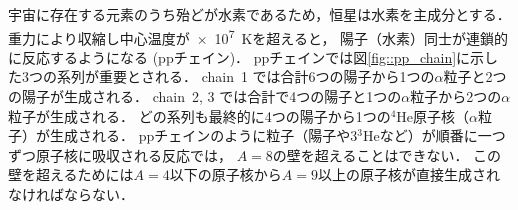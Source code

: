 \documentclass[../master]{subfiles}
\begin{document}
宇宙に存在する元素のうち殆どが水素であるため，恒星は水素を主成分とする．
重力により収縮し中心温度が\SI{e7}{\kelvin}を超えると，
陽子（水素）同士が連鎖的に反応するようになる (ppチェイン)．
ppチェインでは図\ref{fig::pp_chain}に示した3つの系列が重要とされる．
chain~1 では合計6つの陽子から1つの$\alpha$粒子と2つの陽子が生成される．
chain~2, 3 では合計で4つの陽子と1つの$\alpha$粒子から2つの$\alpha$粒子が生成される．
どの系列も最終的に4つの陽子から1つの${}^{4}\mathrm{He}$原子核（$\alpha$粒子）が生成される．
ppチェインのように粒子（陽子や$3{}^{3}\mathrm{He}$など）が順番に一つずつ原子核に吸収される反応では，
$A = 8$の壁を超えることはできない．
この壁を超えるためには$A = 4$以下の原子核から$A = 9$以上の原子核が直接生成されなければならない．
\end{document}
